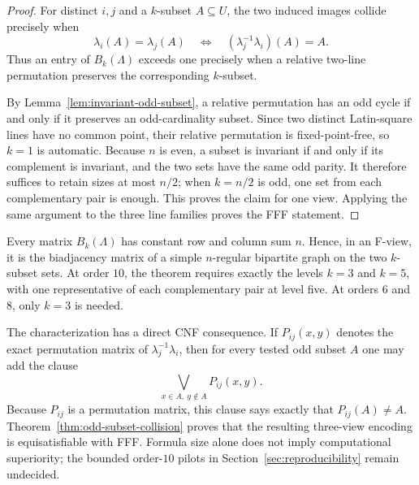 \begin{proof}
For distinct $i,j$ and a $k$-subset $A\subseteq U$, the two induced images
collide precisely when
\[
 \lambda_i(A)=\lambda_j(A)
 \quad\Longleftrightarrow\quad
 (\lambda_j^{-1}\lambda_i)(A)=A.
\]
Thus an entry of $B_k(\Lambda)$ exceeds one precisely when a relative
two-line permutation preserves the corresponding $k$-subset.

By Lemma~\ref{lem:invariant-odd-subset}, a relative permutation has an odd
cycle if and only if it preserves an odd-cardinality subset.  Since two
distinct Latin-square lines have no common point, their relative permutation
is fixed-point-free, so $k=1$ is automatic.  Because $n$ is even, a subset is
invariant if and only if its complement is invariant, and the two sets have
the same odd parity.  It therefore suffices to retain sizes at most $n/2$;
when $k=n/2$ is odd, one set from each complementary pair is enough.  This
proves the claim for one view.  Applying the same argument to the three line
families proves the FFF statement.
\end{proof}

Every matrix $B_k(\Lambda)$ has constant row and column sum $n$.  Hence, in
an F-view, it is the biadjacency matrix of a simple $n$-regular bipartite
graph on the two $k$-subset sets.  At order $10$, the theorem requires exactly
the levels $k=3$ and $k=5$, with one representative of each complementary
pair at level five.  At orders $6$ and $8$, only $k=3$ is needed.

The characterization has a direct CNF consequence.  If $P_{ij}(x,y)$ denotes
the exact permutation matrix of $\lambda_j^{-1}\lambda_i$, then for every
tested odd subset $A$ one may add the clause
\[
 \bigvee_{x\in A,\ y\notin A} P_{ij}(x,y).
\]
Because $P_{ij}$ is a permutation matrix, this clause says exactly that
$P_{ij}(A)\neq A$.  Theorem~\ref{thm:odd-subset-collision} proves that the
resulting three-view encoding is equisatisfiable with FFF.  Formula size alone
does not imply computational superiority; the bounded order-$10$ pilots in
Section~\ref{sec:reproducibility} remain undecided.
